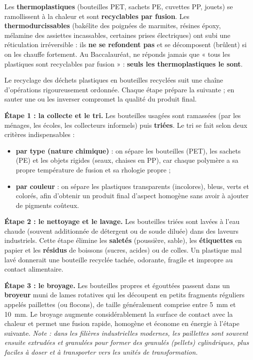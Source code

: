 \documentclass[11pt]{article}
\newcommand{\cle}[1]{{\popxbold\color{popdark}#1}}
\newcounter{popsec}
\newcounter{popsub}
\newcommand{\courssub}[1]{%
  \stepcounter{popsub}%
  \par\vspace{9pt}\noindent{\popxbold\fontsize{11.5}{13}\selectfont\color{popink}{\color{poporange}\thepopsec.\thepopsub}\hspace{6pt}#1}\par\nopagebreak\vspace{4pt}
}
\begin{document}
\begin{attention}
Les \textbf{thermoplastiques} (bouteilles PET, sachets PE, cuvettes PP, jouets) se ramollissent à la chaleur et sont \textbf{recyclables par fusion}. Les \textbf{thermodurcissables} (bakélite des poignées de marmites, résines époxy, mélamine des assiettes incassables, certaines prises électriques) ont subi une réticulation irréversible : ils \textbf{ne se refondent pas} et se décomposent (brûlent) si on les chauffe fortement. Au Baccalauréat, ne réponds jamais que « tous les plastiques sont recyclables par fusion » : \textbf{seuls les thermoplastiques le sont}.
\end{attention}

\courssub{Les étapes du recyclage des bouteilles plastiques}

Le recyclage des déchets plastiques en bouteilles recyclées suit une chaîne d'opérations rigoureusement ordonnée. Chaque étape prépare la suivante ; en sauter une ou les inverser compromet la qualité du produit final.

\textbf{Étape 1 : la collecte et le tri.} Les bouteilles usagées sont ramassées (par les ménages, les écoles, les collecteurs informels) puis \textbf{triées}. Le tri se fait selon deux critères indispensables :
\begin{itemize}
\item \textbf{par type (nature chimique)} : on sépare les bouteilles (PET), les sachets (PE) et les objets rigides (seaux, chaises en PP), car chaque polymère a sa propre température de fusion et sa rhologie propre ;
\item \textbf{par couleur} : on sépare les plastiques transparents (incolores), bleus, verts et colorés, afin d'obtenir un produit final d'aspect homogène sans avoir à ajouter de pigments coûteux.
\end{itemize}

\textbf{Étape 2 : le nettoyage et le lavage.} Les bouteilles triées sont lavées à l'eau chaude (souvent additionnée de détergent ou de soude diluée) dans des laveurs industriels. Cette étape élimine les \textbf{saletés} (poussière, sable), les \textbf{étiquettes} en papier et les \textbf{résidus} de boissons (sucres, acides) ou de colles. Un plastique mal lavé donnerait une bouteille recyclée tachée, odorante, fragile et impropre au contact alimentaire.

\textbf{Étape 3 : le broyage.} Les bouteilles propres et égouttées passent dans un \textbf{broyeur} muni de lames rotatives qui les découpent en petits fragments réguliers appelés \cle{paillettes} (ou \cle{flocons}), de taille généralement comprise entre \SI{5}{\milli\metre} et \SI{10}{\milli\metre}. Le broyage augmente considérablement la surface de contact avec la chaleur et permet une fusion rapide, homogène et économe en énergie à l'étape suivante. \emph{Note : dans les filières industrielles modernes, les paillettes sont souvent ensuite extrudées et granulées pour former des \cle{granulés} (pellets) cylindriques, plus faciles à doser et à transporter vers les unités de transformation.}
\end{document}
